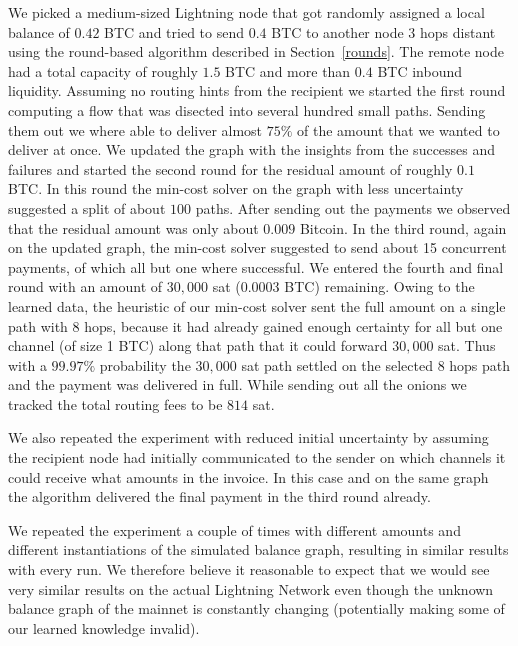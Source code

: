 \documentclass[10pt,twocolumn]{article}
\begin{document}
We picked a medium-sized Lightning node that got randomly assigned a local balance of $0.42$ BTC and tried to send $0.4$ BTC to another node $3$ hops distant using the round-based algorithm described in Section~\ref{rounds}.
The remote node had a total capacity of roughly $1.5$ BTC and more than $0.4$ BTC inbound liquidity. 
Assuming no routing hints from the recipient we started the first round computing a flow that was disected into several hundred small paths.
Sending them out we where able to deliver almost $75\%$ of the amount that we wanted to deliver at once.
We updated the graph with the insights from the successes and failures and started the second round for the residual amount of roughly $0.1$ BTC.
In this round the min-cost solver on the graph with less uncertainty suggested a split of about $100$ paths.
After sending out the payments we observed that the residual amount was only about $0.009$ Bitcoin.
In the third round, again on the updated graph, the min-cost solver suggested to send about 15 concurrent payments, of which all but one where successful.
We entered the fourth and final round with an amount of $30,000$ sat ($0.0003$ BTC) remaining.
Owing to the learned data, the heuristic of our min-cost solver sent the full amount on a single path with $8$ hops, because it had already gained enough certainty for all but one channel (of size 1 BTC) along that path that it could forward $30,000$ sat.
Thus with a $99.97\%$ probability the $30,000$ sat path settled on the selected $8$ hops path and the payment was delivered in full.
While sending out all the onions we tracked the total routing fees to be $814$ sat.

We also repeated the experiment with reduced initial uncertainty by assuming the recipient node had initially communicated to the sender on which channels it could receive what amounts in the invoice.
In this case and on the same graph the algorithm delivered the final payment in the third round already.

We repeated the experiment a couple of times with different amounts and different instantiations of the simulated balance graph, resulting in similar results with every run. We therefore believe it reasonable to expect that we would see very similar results on the actual Lightning Network even though the unknown balance graph of the mainnet is constantly changing (potentially making some of our learned knowledge invalid).
\end{document}
